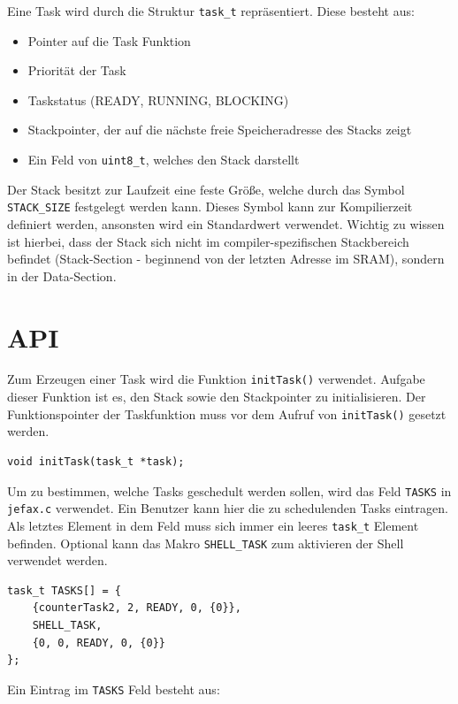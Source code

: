 \documentclass[fontsize=12pt, toc=bibliography, notitlepage]{scrreprt}
\begin{document}
Eine Task wird durch die Struktur \lstinline$task_t$ repräsentiert. Diese besteht aus:

\begin{itemize}
\item Pointer auf die Task Funktion
\item Priorität der Task
\item Taskstatus (READY, RUNNING, BLOCKING)
\item Stackpointer, der auf die nächste freie Speicheradresse des Stacks zeigt
\item Ein Feld von \lstinline$uint8_t$, welches den Stack darstellt
\end{itemize}

Der Stack besitzt zur Laufzeit eine feste Größe, welche durch das Symbol \lstinline$STACK_SIZE$ festgelegt werden kann. Dieses Symbol kann zur Kompilierzeit definiert werden, ansonsten wird ein Standardwert verwendet. Wichtig zu wissen ist hierbei, dass der Stack sich nicht im compiler-spezifischen Stackbereich befindet (Stack-Section - beginnend von der letzten Adresse im SRAM), sondern in der Data-Section.

\section{API}
\label{subsec:tasks-api}
Zum Erzeugen einer Task wird die Funktion \lstinline$initTask()$ verwendet. Aufgabe dieser Funktion ist es, den Stack sowie den Stackpointer zu initialisieren. Der Funktionspointer der Taskfunktion muss vor dem Aufruf von \lstinline$initTask()$ gesetzt werden.

\begin{lstlisting}
void initTask(task_t *task);
\end{lstlisting}

Um zu bestimmen, welche Tasks geschedult werden sollen, wird das Feld \lstinline$TASKS$ in \lstinline$jefax.c$ verwendet. Ein Benutzer kann hier die zu schedulenden Tasks eintragen. Als letztes Element in dem Feld muss sich immer ein leeres \lstinline$task_t$ Element befinden. Optional kann das Makro \lstinline$SHELL_TASK$ zum aktivieren der Shell verwendet werden.

\begin{lstlisting}[title=jefax.c]
task_t TASKS[] = {
    {counterTask2, 2, READY, 0, {0}},
    SHELL_TASK,
    {0, 0, READY, 0, {0}}
};
\end{lstlisting}

Ein Eintrag im \lstinline$TASKS$ Feld besteht aus:
\end{document}
